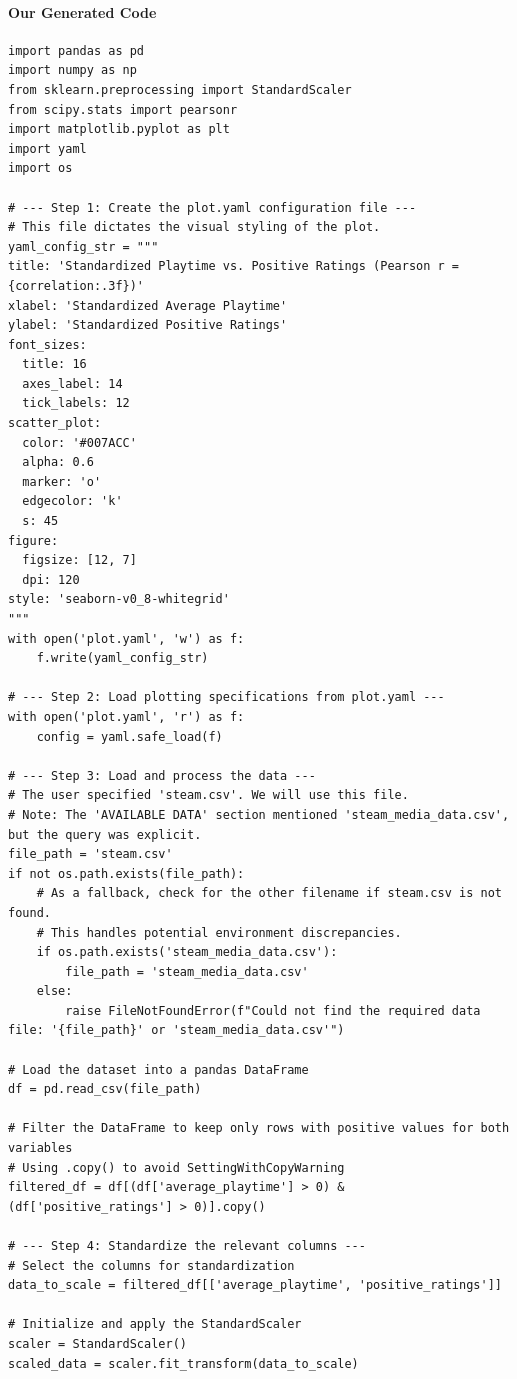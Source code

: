 \documentclass[11pt, a4paper, logo, copyright]{googlecloud}
\begin{document}
\paragraph{Our Generated Code}
\begin{verbatim}
import pandas as pd
import numpy as np
from sklearn.preprocessing import StandardScaler
from scipy.stats import pearsonr
import matplotlib.pyplot as plt
import yaml
import os

# --- Step 1: Create the plot.yaml configuration file ---
# This file dictates the visual styling of the plot.
yaml_config_str = """
title: 'Standardized Playtime vs. Positive Ratings (Pearson r = {correlation:.3f})'
xlabel: 'Standardized Average Playtime'
ylabel: 'Standardized Positive Ratings'
font_sizes:
  title: 16
  axes_label: 14
  tick_labels: 12
scatter_plot:
  color: '#007ACC'
  alpha: 0.6
  marker: 'o'
  edgecolor: 'k'
  s: 45
figure:
  figsize: [12, 7]
  dpi: 120
style: 'seaborn-v0_8-whitegrid'
"""
with open('plot.yaml', 'w') as f:
    f.write(yaml_config_str)

# --- Step 2: Load plotting specifications from plot.yaml ---
with open('plot.yaml', 'r') as f:
    config = yaml.safe_load(f)

# --- Step 3: Load and process the data ---
# The user specified 'steam.csv'. We will use this file.
# Note: The 'AVAILABLE DATA' section mentioned 'steam_media_data.csv', but the query was explicit.
file_path = 'steam.csv'
if not os.path.exists(file_path):
    # As a fallback, check for the other filename if steam.csv is not found.
    # This handles potential environment discrepancies.
    if os.path.exists('steam_media_data.csv'):
        file_path = 'steam_media_data.csv'
    else:
        raise FileNotFoundError(f"Could not find the required data file: '{file_path}' or 'steam_media_data.csv'")

# Load the dataset into a pandas DataFrame
df = pd.read_csv(file_path)

# Filter the DataFrame to keep only rows with positive values for both variables
# Using .copy() to avoid SettingWithCopyWarning
filtered_df = df[(df['average_playtime'] > 0) & (df['positive_ratings'] > 0)].copy()

# --- Step 4: Standardize the relevant columns ---
# Select the columns for standardization
data_to_scale = filtered_df[['average_playtime', 'positive_ratings']]

# Initialize and apply the StandardScaler
scaler = StandardScaler()
scaled_data = scaler.fit_transform(data_to_scale)


\end{verbatim}
\end{document}
